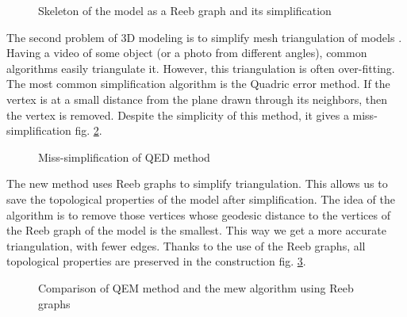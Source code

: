 \documentclass[]{article}
\begin{document}
\begin{figure}[h!]
\caption{Skeleton of the model as a Reeb graph and its simplification}
\label{fig:skeleton}
\end{figure}

The second problem of 3D modeling is to simplify mesh triangulation of models \cite{QEM}. Having a video of some object (or a photo from different angles), common algorithms easily triangulate it. However, this triangulation is often over-fitting. The most common simplification algorithm is the Quadric error method. If the vertex is at a small distance from the plane drawn through its neighbors, then the vertex is removed. Despite the simplicity of this method, it gives a miss-simplification fig. \ref{fig:QED}.\\
\begin{figure}[h!]
\caption{Miss-simplification of QED method}
\label{fig:QED}
\end{figure}

The new method uses Reeb graphs to simplify triangulation. This allows us to save the topological properties of the model after simplification. The idea of the algorithm is to remove those vertices whose geodesic distance to the vertices of the Reeb graph of the model is the smallest. This way we get a more accurate triangulation, with fewer edges. Thanks to the use of the Reeb graphs, all topological properties are preserved in the construction fig. \ref{fig:New_alg}.
\begin{figure}[h!]
\caption{Comparison of QEM method and the mew algorithm using Reeb graphs}
\label{fig:New_alg}
\end{figure}
\end{document}
